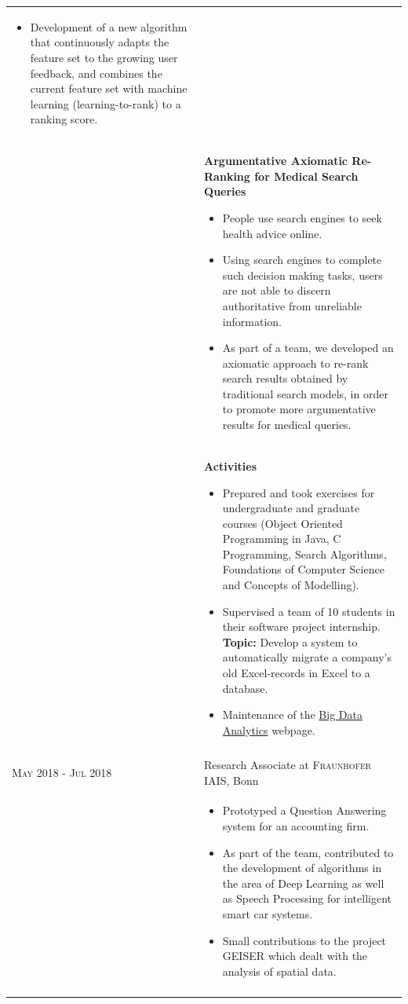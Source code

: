 \documentclass[a4paper,10pt]{article} %
\begin{document}
\begin{longtable}{l p{11cm}}
{\begin{itemize}
		\item Development of a new algorithm that continuously adapts the feature set to the growing user feedback, and combines the current feature set with machine learning (learning-to-rank) to a ranking score.    
  \end{itemize}
  }
\\[-2mm]
& \textbf{\footnotesize{Argumentative Axiomatic Re-Ranking for Medical Search Queries}}\vspace{0.2em}
  {\footnotesize
  	\begin{itemize}
  		\setlength\itemsep{0.2em}
 		\item People use search engines to seek health advice online. 
		\item Using search engines to complete such decision making tasks, users are not able to discern authoritative from unreliable information.
		\item As part of a team, we developed an axiomatic approach to re-rank search results obtained by traditional search models, in order to promote more argumentative results for medical queries.   
  \end{itemize}
  }
\\[-2mm]
& \textbf{\footnotesize{Activities}}\vspace{0.2em}
  {\footnotesize
  	\begin{itemize}
  		\setlength\itemsep{0.2em}
 		\item Prepared and took exercises for undergraduate and graduate courses (Object Oriented Programming in Java, C Programming, Search Algorithms, Foundations of Computer Science and Concepts of Modelling).
 		\item Supervised a team of 10 students in their software project internship. \newline \textbf{Topic:} Develop a system to automatically migrate a company's old Excel-records in Excel to a database.
 		\item Maintenance of the \href{https://www.informatik.uni-halle.de/arbeitsgruppen/big_data_analytics/}{Big Data Analytics} webpage.    
  \end{itemize}
  }
\\
\multicolumn{2}{c}{} \\[-1.5em]

\textsc{May 2018 - Jul 2018} & Research Associate at \textsc{Fraunhofer IAIS}, Bonn\\[-1em]
& {\footnotesize
  	\begin{itemize}
  		\setlength\itemsep{0.2em}
 		\item Prototyped a Question Answering system for an accounting firm.
		\item As part of the team, contributed to the development of algorithms in the area of Deep Learning as well as Speech Processing for intelligent smart car systems.
		\item Small contributions to the project GEISER which dealt with the analysis of spatial data. 
  \end{itemize}
  }\\
\multicolumn{2}{c}{} \\[-1.5em]


\end{longtable}
\end{document}
